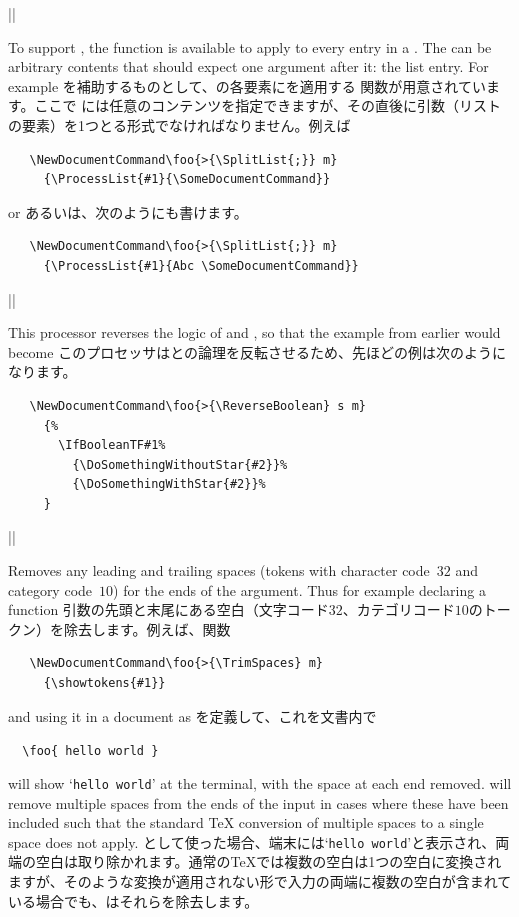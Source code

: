 \documentclass{ltxguide}
\newcommand\jpnewline{\vspace{3pt}\newline}
\begin{document}
\begin{decl}
  |\ProcessList|  
\end{decl}
To support , the function  is available
to apply  to every entry in a . The
 can be arbitrary contents that should expect one argument
after it: the list entry. For example
\jpnewline
{}を補助するものとして、の各要素にを適用する 関数が用意されています。ここで には任意のコンテンツを指定できますが、その直後に引数（リストの要素）を1つとる形式でなければなりません。例えば
\begin{verbatim}
   \NewDocumentCommand\foo{>{\SplitList{;}} m}
     {\ProcessList{#1}{\SomeDocumentCommand}}
\end{verbatim}
or
\jpnewline
あるいは、次のようにも書けます。
\begin{verbatim}
   \NewDocumentCommand\foo{>{\SplitList{;}} m}
     {\ProcessList{#1}{Abc \SomeDocumentCommand}}
\end{verbatim}

\begin{decl}
  |\ReverseBoolean|
\end{decl}
This processor reverses the logic of  and
, so that the example from earlier would become
\jpnewline
このプロセッサはとの論理を反転させるため、先ほどの例は次のようになります。
\begin{verbatim}
   \NewDocumentCommand\foo{>{\ReverseBoolean} s m}
     {%
       \IfBooleanTF#1%
         {\DoSomethingWithoutStar{#2}}%
         {\DoSomethingWithStar{#2}}%
     }
\end{verbatim}

\begin{decl}
  |\TrimSpaces|
\end{decl}
Removes any leading and trailing spaces (tokens with character code~$32$
and category code~$10$) for the ends of the argument. Thus for example
declaring a function
\jpnewline
引数の先頭と末尾にある空白（文字コード\(32\)、カテゴリコード\(10\)のトークン）を除去します。例えば、関数
\begin{verbatim}
   \NewDocumentCommand\foo{>{\TrimSpaces} m}
     {\showtokens{#1}}
\end{verbatim}
and using it in a document as
\jpnewline
を定義して、これを文書内で
\begin{flushleft}
  \verb=  =\verb*=\foo{ hello world }=
\end{flushleft}
will show `\verb*=hello world=' at the terminal, with the space at each
end removed.  will remove multiple spaces from the ends of
the input in cases where these have been included such that the standard
\TeX{} conversion of multiple spaces to a single space does not apply.
\jpnewline
として使った場合、端末には`\verb*=hello world='と表示され、両端の空白は取り除かれます。通常の\TeX{}では複数の空白は1つの空白に変換されますが、そのような変換が適用されない形で入力の両端に複数の空白が含まれている場合でも、はそれらを除去します。
\end{document}
